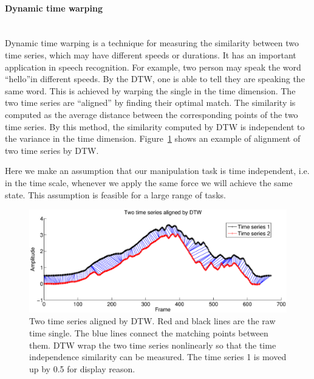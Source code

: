 \paragraph{Dynamic time warping} ~\\
Dynamic time warping is a technique for measuring the similarity between two time series, which may have different speeds or durations. It has an important application in speech recognition. For example, two person may speak the word ``hello''in different speeds. By the DTW, one is able to tell they are speaking the same word. This is achieved by warping the single in the time dimension. The two time series are ``aligned'' by finding their optimal match. The similarity is computed as the average distance between the corresponding points of the two time series. By this method, the similarity computed by DTW is independent to the variance in the time dimension. Figure~\ref{fig:alignDTW} shows an example of alignment of two time series by DTW.

Here we make an assumption that our manipulation task is time independent, i.e. in the time scale, whenever we apply the same force we will achieve the same state. This assumption is feasible for a large range of tasks.

\begin{figure}
  \centering
  \includegraphics[width=16cm]{./fig_cha4/alignDTW.eps}
  \caption{ \scriptsize{Two time series aligned by DTW. Red and black lines are the raw time single. The blue lines connect the matching points between them. DTW wrap the two time series nonlinearly so that the time independence similarity can be measured. The time series 1 is moved up by 0.5 for display reason.}
}
\label{fig:alignDTW}
\end{figure}



